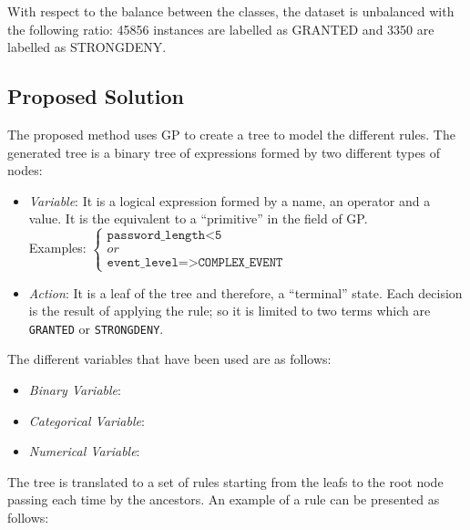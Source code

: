 \documentclass[a4paper,10pt,twocolumn,preprint,3p]{elsarticle}
\begin{document}
With respect to the balance between the classes, the dataset is unbalanced with the following ratio: 45856 instances are labelled as GRANTED and 3350 are labelled as STRONGDENY.

\subsection{Proposed Solution}
\label{subsec:solution}
The proposed method uses GP to create a tree to model the different rules. The generated tree
is a binary tree of expressions formed by two different types of nodes:

\begin{itemize}
\item {\em Variable}: It is a logical expression formed by a name, an operator and a value. It is the equivalent to a ``primitive'' in the field of GP. \\
    Examples:
   \begin{math}
     \left \{
   \begin{array}{l}
     \texttt{password\_length<5} \\
     or \\
      \texttt{event\_level=>COMPLEX\_EVENT}
   \end{array}
   \right .
   \end{math}
\item {\em Action}: It is a leaf of the   tree and therefore, a ``terminal'' state. Each decision is the result of applying the rule; so it is limited to two terms which are \texttt{GRANTED} or \texttt{STRONGDENY}.
\end{itemize}

The different variables that have been used are as follows:

\begin{itemize}
\item {\em Binary Variable}: %
\item {\em Categorical Variable}:
\item {\em Numerical Variable}:

\end{itemize}

The tree is translated to a set of rules starting from the leafs to the root node passing each time by the ancestors. An example of a rule can be presented as follows:
\end{document}
